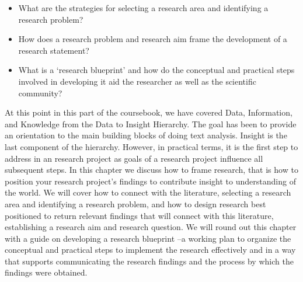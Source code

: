 \documentclass[
  letterpaper,
]{scrbook}
\providecommand{\tightlist}{%
  \setlength{\itemsep}{0pt}\setlength{\parskip}{0pt}}\usepackage{longtable,booktabs,array}
\begin{document}
\begin{tcolorbox}[enhanced jigsaw, title=\textcolor{quarto-callout-note-color}{\faInfo}\hspace{0.5em}{Keys}, titlerule=0mm, toptitle=1mm, colbacktitle=quarto-callout-note-color!10!white, bottomtitle=1mm, left=2mm, colframe=quarto-callout-note-color-frame, breakable, toprule=.15mm, colback=white, opacitybacktitle=0.6, leftrule=.75mm, rightrule=.15mm, bottomrule=.15mm, arc=.35mm, coltitle=black, opacityback=0]

\begin{itemize}
\tightlist
\item
  What are the strategies for selecting a research area and identifying
  a research problem?
\item
  How does a research problem and research aim frame the development of
  a research statement?
\item
  What is a `research blueprint' and how do the conceptual and practical
  steps involved in developing it aid the researcher as well as the
  scientific community?
\end{itemize}

\end{tcolorbox}

At this point in this part of the coursebook, we have covered Data,
Information, and Knowledge from the Data to Insight Hierarchy. The goal
has been to provide an orientation to the main building blocks of doing
text analysis. Insight is the last component of the hierarchy. However,
in practical terms, it is the first step to address in an research
project as goals of a research project influence all subsequent steps.
In this chapter we discuss how to frame research, that is how to
position your research project's findings to contribute insight to
understanding of the world. We will cover how to connect with the
literature, selecting a research area and identifying a research
problem, and how to design research best positioned to return relevant
findings that will connect with this literature, establishing a research
aim and research question. We will round out this chapter with a guide
on developing a research blueprint --a working plan to organize the
conceptual and practical steps to implement the research effectively and
in a way that supports communicating the research findings and the
process by which the findings were obtained.
\end{document}
